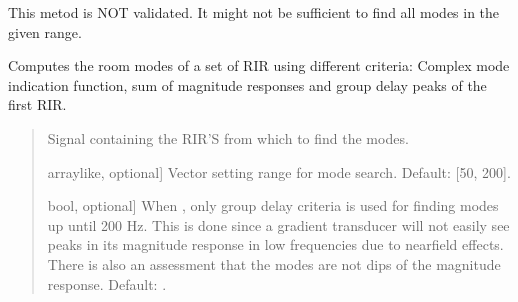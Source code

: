 \documentclass[letterpaper,10pt,english]{sphinxmanual}
\begin{document}

\begin{fulllineitems}
\label{\detokenize{modules/dsptools.room_acoustics:dsptools.room_acoustics.find_modes}}
\pysigstartsignatures
{}
\pysigstopsignatures
\sphinxAtStartPar
This metod is NOT validated. It might not be sufficient to find all
modes in the given range.

\sphinxAtStartPar
Computes the room modes of a set of RIR using different criteria:
Complex mode indication function, sum of magnitude responses and group
delay peaks of the first RIR.
\begin{quote}\begin{description}
\begin{description}
\sphinxlineitem{\sphinxstylestrong{signal}}{[}\sphinxtitleref{Signal}{]}
\sphinxAtStartPar
Signal containing the RIR’S from which to find the modes.

\sphinxlineitem{\sphinxstylestrong{f\_range\_hz}}{[}array\sphinxhyphen{}like, optional{]}
\sphinxAtStartPar
Vector setting range for mode search. Default: {[}50, 200{]}.

\sphinxlineitem{\sphinxstylestrong{proximity\_effect}}{[}bool, optional{]}
\sphinxAtStartPar
When , only group delay criteria is used for finding modes
up until 200 Hz. This is done since a gradient transducer will not
easily see peaks in its magnitude response in low frequencies
due to near\sphinxhyphen{}field effects.
There is also an assessment that the modes are not dips of
the magnitude response. Default: .


\end{description}
\end{description}
\end{quote}
\end{fulllineitems}
\end{document}
